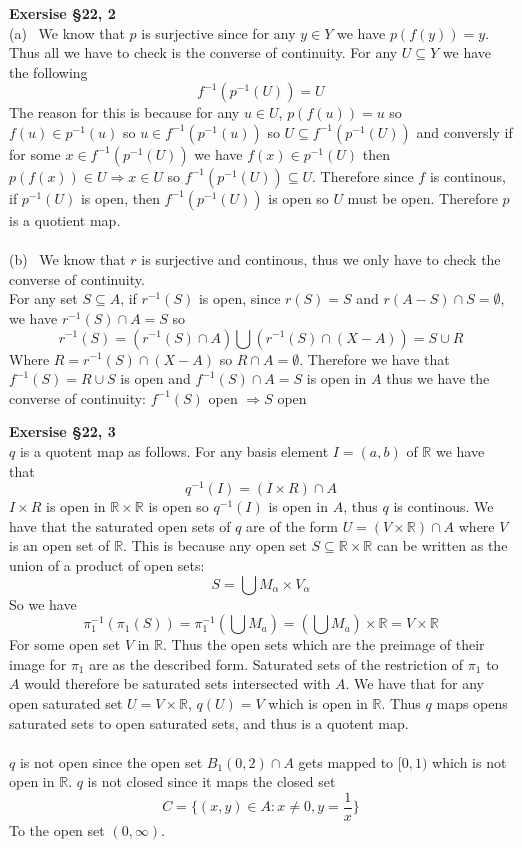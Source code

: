 \documentclass[12pt]{article}
\newenvironment{ques}[1]{\textbf{Exersise #1}\vspace{1 mm}\\ }{\bigskip}
\theoremstyle{definition}
\renewcommand{\l}{\left }
\renewcommand{\r}{\right }
\newcommand{\R}{\mathbb R}
\renewcommand{\a}{\alpha}
\begin{document}
\begin{ques}{\S 22, 2}
	(a) \ We know that $p$ is surjective since for any $y \in Y$ we have
	$p(f(y)) = y$. Thus all we have to check is the converse of continuity. For any
	$U \subseteq Y$ we have the following
	$$f^{-1}(p^{-1}(U)) = U$$
	The reason for this is because for any $u \in U$, $p(f(u)) = u$ so $f(u)
	\in p^{-1}(u)$ so $u \in f^{-1}(p^{-1}(u))$ so $U \subseteq
	f^{-1}(p^{-1}(U))$ and conversly if for some $x \in f^{-1}(p^{-1}(U))$ we
	have $f(x) \in p^{-1}(U)$ then $p(f(x)) \in U \Rightarrow x \in U$ so
	$f^{-1}(p^{-1}(U)) \subseteq U$. Therefore since $f$ is continous, if
	$p^{-1}(U)$ is open, then $f^{-1}(p^{-1}(U))$ is open so $U$ must be open.
	Therefore $p$ is a quotient map.\\
	\\
	(b) \ We know that $r$ is surjective and continous, thus we only have to
	check the converse of continuity.\\
	For any set $S \subseteq A$, if $r^{-1}(S)$ is open, since
	$r(S) = S$ and $r(A - S) \cap S = \emptyset$, we have $r^{-1}(S) \cap A =
	S$ so
	$$r^{-1}(S) = (r^{-1}(S) \cap A) \bigcup (r^{-1}(S) \cap (X - A) ) = S
	\cup R$$
	Where $R = r^{-1}(S) \cap (X - A)$ so $R \cap A = \emptyset$. Therefore we
	have that $f^{-1}(S) = R \cup S$ is open and $f^{-1}(S) \cap A = S$ is open
	in $A$ thus we have the converse of continuity: $f^{-1}(S)$ open
	$\Rightarrow S$ open 
\end{ques}

\begin{ques}{\S 22, 3}
	$q$ is a quotent map as follows. For any basis element $I = (a,b)$ of $\R$
	we have that 
	$$q^{-1}(I) = (I \times R) \cap A$$
	$I \times R$ is open in $\R \times \R$ is open so $q^{-1}(I)$ is open in
	$A$, thus $q$ is continous. We have that the saturated open sets of $q$ are of
	the form $U = (V \times \R) \cap A$ where $V$ is an open set of $\R$. This is
	because any open set $S \subseteq \R \times \R$ can be written as the union
	of a product of open sets:
	$$S = \bigcup M_\a \times V_\a$$
	So we have 
	$$\pi_1^{-1}(\pi_1(S)) = \pi^{-1}_1\l (\bigcup M_a \r ) = \l
	(\bigcup M_a \r) \times \R = V \times \R$$
	For some open set $V$ in $\R$. Thus the open sets which are the preimage of
	their image for $\pi_1$ are as the described form. Saturated sets of the
	restriction of $\pi_1$ to $A$ would therefore be saturated sets intersected
	with $A$. We have that for any open saturated set $U = V \times \R$, $q(U)
	= V$ which is open in $\R$. Thus $q$ maps opens saturated sets to open
	saturated sets, and thus is a quotent map.\\
	\\
	$q$ is not open since the open set $B_1(0,2) \cap A$ gets mapped to $[0,1)$
	which is not open in $\R$. $q$ is not closed since it maps the closed set 
	$$C = \{(x,y) \in A: x \neq 0, y = \frac 1 x\}$$
	To the open set $(0,\infty)$.
\end{ques}
\end{document}
